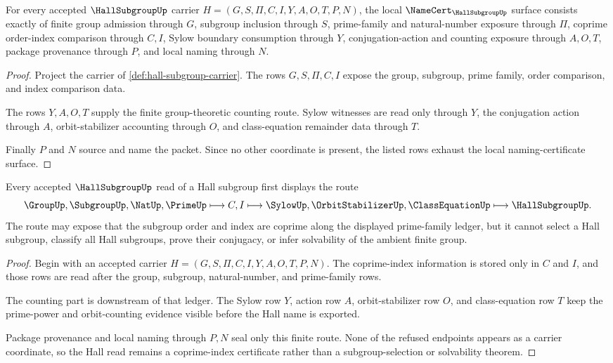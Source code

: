 \begin{theorem}
\label{thm:hall-subgroup-namecert-obligations}
For every accepted $\HallSubgroupUp$ carrier $H=(G,S,\Pi,C,I,Y,A,O,T,P,N)$, the local $\NameCert_{\HallSubgroupUp}$ surface consists exactly of finite group admission through $G$, subgroup inclusion through $S$, prime-family and natural-number exposure through $\Pi$, coprime order-index comparison through $C,I$, Sylow boundary consumption through $Y$, conjugation-action and counting exposure through $A,O,T$, package provenance through $P$, and local naming through $N$.
\end{theorem}
\begin{proof}
Project the carrier of \autoref{def:hall-subgroup-carrier}. The rows $G,S,\Pi,C,I$ expose the group, subgroup, prime family, order comparison, and index comparison data.

The rows $Y,A,O,T$ supply the finite group-theoretic counting route. Sylow witnesses are read only through $Y$, the conjugation action through $A$, orbit-stabilizer accounting through $O$, and class-equation remainder data through $T$.

Finally $P$ and $N$ source and name the packet. Since no other coordinate is present, the listed rows exhaust the local naming-certificate surface.
\end{proof}

\begin{theorem}
\label{thm:hall-subgroup-coprime-index-route}
Every accepted $\HallSubgroupUp$ read of a Hall subgroup first displays the route
$$
\GroupUp,\SubgroupUp,\NatUp,\PrimeUp \longmapsto C,I \longmapsto \SylowUp,\OrbitStabilizerUp,\ClassEquationUp \longmapsto \HallSubgroupUp .
$$
The route may expose that the subgroup order and index are coprime along the displayed prime-family ledger, but it cannot select a Hall subgroup, classify all Hall subgroups, prove their conjugacy, or infer solvability of the ambient finite group.
\end{theorem}
\begin{proof}
Begin with an accepted carrier $H=(G,S,\Pi,C,I,Y,A,O,T,P,N)$. The coprime-index information is stored only in $C$ and $I$, and those rows are read after the group, subgroup, natural-number, and prime-family rows.

The counting part is downstream of that ledger. The Sylow row $Y$, action row $A$, orbit-stabilizer row $O$, and class-equation row $T$ keep the prime-power and orbit-counting evidence visible before the Hall name is exported.

Package provenance and local naming through $P,N$ seal only this finite route. None of the refused endpoints appears as a carrier coordinate, so the Hall read remains a coprime-index certificate rather than a subgroup-selection or solvability theorem.
\end{proof}

